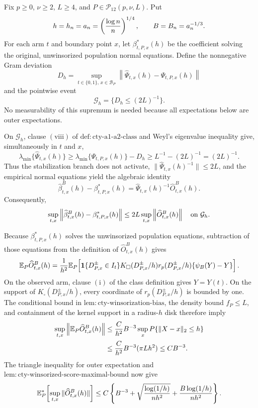 Fix \(p\geq0\), \(\nu\geq2\), \(L\geq4\), and \(P\in\mathcal P_{12}(p,\nu,L)\).  Put
\[
 h=h_n=a_n=\left({\log n\over n}\right)^{1/4},
 \qquad B=B_n=a_n^{-1/3}.
\]
For each arm \(t\) and boundary point \(x\), let \(\beta^*_{t,P,x}(h)\) be the coefficient solving the original, unwinsorized population normal equations.  Define the nonnegative Gram deviation
\[
 D_h=\sup_{t\in\{0,1\},\,x\in\mathcal B_P}
 \left\|\widehat\Psi_{t,x}(h)-\Psi_{t,P,x}(h)\right\|
\]
and the pointwise event
\[
 \mathcal G_h=\{D_h\leq(2L)^{-1}\}.
\]
No measurability of this supremum is needed because all expectations below are outer expectations.

On \(\mathcal G_h\), clause \(\mathrm{(viii)}\) of \(\mathrm{def:cty\text{-}a1\text{-}a2\text{-}class}\) and Weyl's eigenvalue inequality give, simultaneously in \(t\) and \(x\),
\[
 \lambda_{\min}\{\widehat\Psi_{t,x}(h)\}
 \geq \lambda_{\min}\{\Psi_{t,P,x}(h)\}-D_h
 \geq L^{-1}-(2L)^{-1}=(2L)^{-1}.
\]
Thus the stabilization branch does not activate, \(\|\widehat\Psi_{t,x}(h)^{-1}\|\leq2L\), and the empirical normal equations yield the algebraic identity
\[
 \widehat\beta^B_{t,x}(h)-\beta^*_{t,P,x}(h)
 =\widehat\Psi_{t,x}(h)^{-1}\widehat O^B_{t,x}(h).
\]
Consequently,
\[
 \sup_{t,x}\left\|\widehat\beta^B_{t,x}(h)-\beta^*_{t,P,x}(h)\right\|
 \leq2L\sup_{t,x}\left\|\widehat O^B_{t,x}(h)\right\|
 \quad\hbox{on }\mathcal G_h.
\]

Because \(\beta^*_{t,P,x}(h)\) solves the unwinsorized population equations, subtraction of those equations from the definition of \(\widehat O^B_{t,x}(h)\) gives
\[
 \mathbb E_P\widehat O^B_{t,x}(h)
 ={1\over h^2}\mathbb E_P\!\left[
 \mathbf1\{D^{\pm}_{P,x}\in I_t\}K_\square(D^{\pm}_{P,x}/h)
 r_p(D^{\pm}_{P,x}/h)\{\psi_B(Y)-Y\}
 \right].
\]
On the observed arm, clause \(\mathrm{(i)}\) of the class definition gives \(Y=Y(t)\).  On the support of \(K_\square(D^{\pm}_{P,x}/h)\), every coordinate of \(r_p(D^{\pm}_{P,x}/h)\) is bounded by one.  The conditional bound in \(\mathrm{lem:cty\text{-}winsorization\text{-}bias}\), the density bound \(f_P\leq L\), and containment of the kernel support in a radius-\(h\) disk therefore imply
\[
 \begin{split}
 \sup_{t,x}\left\|\mathbb E_P\widehat O^B_{t,x}(h)\right\|
 &\leq {C\over h^2}B^{-3}
 \sup_x P\{\|X-x\|_2\leq h\}\\
 &\leq {C\over h^2}B^{-3}(\pi Lh^2)
 \leq CB^{-3}.
 \end{split}
\]
The triangle inequality for outer expectation and \(\mathrm{lem:cty\text{-}winsorized\text{-}score\text{-}maximal\text{-}bound}\) now give
\[
 \mathbb E_P^*\!\left[\sup_{t,x}\|\widehat O^B_{t,x}(h)\|\right]
 \leq C\left\{
 B^{-3}+\sqrt{{\log(1/h)\over nh^2}}
 +{B\log(1/h)\over nh^2}
 \right\}.
\]

